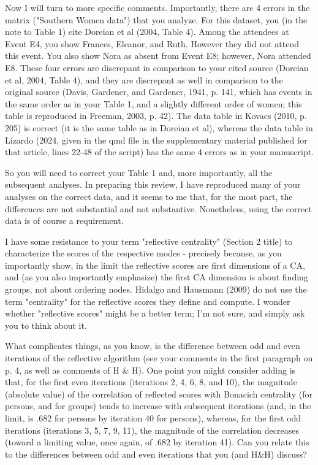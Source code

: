 \documentclass[]{letter}
\begin{document}
Now I will turn to more specific comments. Importantly, there are 4 errors in the matrix ("Southern Women data") that you analyze. For this dataset, you (in the note to Table 1) cite Doreian et al (2004, Table 4). Among the attendees at Event E4, you show Frances, Eleanor, and Ruth. However they did not attend this event. You also show Nora as absent from Event E8; however, Nora attended E8. These four errors are discrepant in comparison to your cited source (Doreian et al, 2004, Table 4), and they are discrepant as well in comparison to the original source (Davis, Gardener, and Gardener, 1941, p. 141, which has events in the same order as in your Table 1, and a slightly different order of women; this table is reproduced in Freeman, 2003, p. 42). The data table in Kovacs (2010, p. 205) is correct (it is the same table as in Doreian et al), whereas the data table in Lizardo (2024, given in the qmd file in the supplementary material published for that article, lines 22-48 of the script) has the same 4 errors as in your manuscript.

So you will need to correct your Table 1 and, more importantly, all the subsequent analyses. In preparing this review, I have reproduced many of your analyses on the correct data, and it seems to me that, for the most part, the differences are not substantial and not substantive. Nonetheless, using the correct data is of course a requirement.

I have some resistance to your term "reflective centrality" (Section 2 title) to characterize the scores of the respective modes - precisely because, as you importantly show, in the limit the reflective scores are first dimensions of a CA, and (as you also importantly emphasize) the first CA dimension is about finding groups, not about ordering nodes. Hidalgo and Hausmann (2009) do not use the term "centrality" for the reflective scores they define and compute. I wonder whether "reflective scores" might be a better term; I'm not sure, and simply ask you to think about it.

What complicates things, as you know, is the difference between odd and even iterations of the reflective algorithm (see your comments in the first paragraph on p. 4, as well as comments of H \& H). One point you might consider adding is that, for the first even iterations (iterations 2, 4, 6, 8, and 10), the magnitude (absolute value) of the correlation of reflected scores with Bonacich centrality (for persons, and for groups) tends to increase with subsequent iterations (and, in the limit, is .682 for persons by iteration 40 for persons), whereas, for the first odd iterations (iterations 3, 5, 7, 9, 11), the magnitude of the correlation decreases (toward a limiting value, once again, of .682 by iteration 41). Can you relate this to the differences between odd and even iterations that you (and H\&H) discuss?
\end{document}
